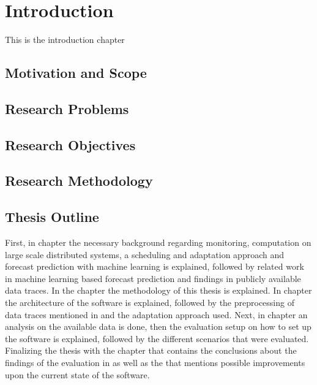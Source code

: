 \chapter{Introduction}

    This is the introduction chapter

        \section{Motivation and Scope}
        \label{sec:motivation-and-scope-introduction}

        \section{Research Problems}
        \label{sec:research-problems-introduction}

        \section{Research Objectives}
        \label{sec:research-objectives-introduction}

        \section{Research Methodology}
        \label{sec:research-methodology-introduction}
        
        \section{Thesis Outline}
        \label{sec:thesis-outline-introduction}

            First, in chapter  the necessary background regarding monitoring, computation on large scale distributed systems, a scheduling and adaptation approach and forecast prediction with machine learning is explained, followed by related work in machine learning based forecast prediction and findings in publicly available data traces.
            In the chapter  the methodology of this thesis is explained. 
            In chapter  the architecture of the software is explained, followed by the preprocessing of data traces mentioned in  and the adaptation approach used.
            Next, in chapter  an analysis on the available data is done, then the evaluation setup on how to set up the software is explained, followed by the different scenarios that were evaluated. 
            Finalizing the thesis with the chapter  that contains the conclusions about the findings of the evaluation in  as well as the  that mentions possible improvements upon the current state of the software.


